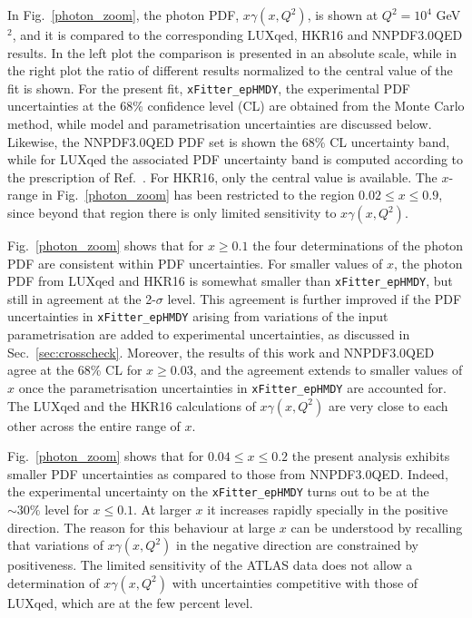 In Fig.~\ref{photon_zoom}, the photon PDF, $x\gamma(x,Q^2)$, is shown at
$Q^2=10^4$ GeV$^2$,  and it is compared to the corresponding LUXqed,
HKR16 and NNPDF3.0QED results.
%
In the left plot the comparison is presented in an absolute scale, while
in the right plot the ratio of
different results normalized to
the central value of the fit is shown.
%
For the present fit, {\tt xFitter\_epHMDY}, 
the experimental PDF uncertainties at the 68\% confidence level (CL) are obtained from the Monte Carlo method,
 while model and parametrisation uncertainties are discussed below.
Likewise, the  NNPDF3.0QED PDF set is shown the 68\% CL uncertainty band,
while for LUXqed the associated PDF uncertainty band is computed according to the
prescription of Ref.~\cite{Manohar:2016nzj}.
For HKR16, only the central value is available.
%
The $x$-range in Fig.~\ref{photon_zoom} has been restricted to the region
$0.02 \le x \le 0.9$, since beyond that region there is only limited sensitivity to $x\gamma(x,Q^2)$.

Fig.~\ref{photon_zoom} shows that for $x\ge 0.1$ the four determinations of
the photon PDF are consistent within PDF uncertainties.
%
For smaller values of $x$, the photon PDF from LUXqed and HKR16 is somewhat smaller than {\tt xFitter\_epHMDY},
but still in agreement at the 2-$\sigma$ level.
%
This agreement is further improved if the PDF uncertainties in
{\tt xFitter\_epHMDY}
arising from variations of the input parametrisation are added to experimental
uncertainties, as discussed in Sec.~\ref{sec:crosscheck}.
%
Moreover, the results of this work and NNPDF3.0QED agree at the 68\% CL for $x\ge 0.03$,
and the agreement extends to smaller values of $x$ once the parametrisation
uncertainties in {\tt xFitter\_epHMDY} are accounted for.
%
The LUXqed and the HKR16 calculations of $x\gamma(x,Q^2)$ are very close
to each other across the entire range of $x$.

Fig.~\ref{photon_zoom} shows that
for $0.04 \le x \le 0.2$ the present analysis  exhibits smaller PDF
uncertainties as compared to those from  NNPDF3.0QED.
%
Indeed, the experimental uncertainty on the {\tt xFitter\_epHMDY}
turns out to be at the  $\sim 30\%$ level for $x\le 0.1$.
At larger $x$ it increases rapidly
specially in the positive direction.
%
The reason for this behaviour at large $x$ can be understood by recalling that
variations of $x\gamma(x,Q^2)$ in the negative
direction are constrained by positiveness.
%
The limited sensitivity of the ATLAS data  does not allow a determination of $x\gamma(x,Q^2)$ with uncertainties
competitive with those of LUXqed, which are at the few percent level.


